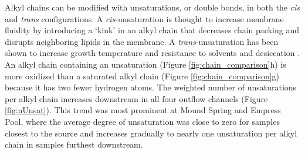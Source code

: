 
Alkyl chains can be modified with unsaturations, or double bonds, in both the \textit{cis} and \textit{trans} configurations. A \textit{cis}-unsaturation is thought to increase membrane fluidity by introducing a `kink' in an alkyl chain that decreases chain packing and disrupts neighboring lipids in the membrane. A \textit{trans}-unsaturation has been shown to increase growth temperature \citep{kiran2005cis} and resistance to solvents and desiccation \citep{halverson2000differential}. An alkyl chain containing an unsaturation (Figure \ref{fig:chain_comparison}h) is more oxidized than a saturated alkyl chain (Figure \ref{fig:chain_comparison}g) because it has two fewer hydrogen atoms. The weighted number of unsaturations per alkyl chain increases downstream in all four outflow channels (Figure \ref{fig:nUnsat}). This trend was most prominent at Mound Spring and Empress Pool, where the average degree of unsaturation was close to zero for samples closest to the source and increases gradually to nearly one unsaturation per alkyl chain in samples furthest downstream.

